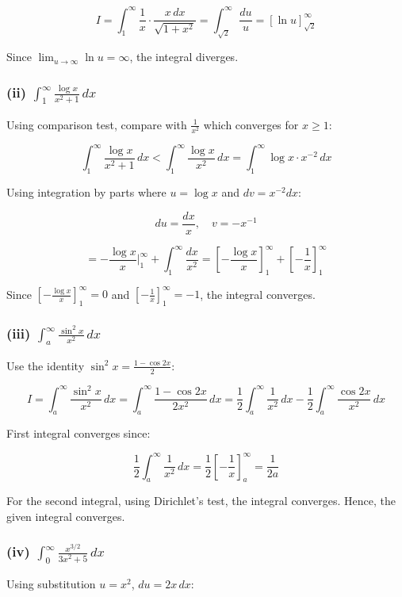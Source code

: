 \documentclass{article}
\begin{document}
\[
I = \int_1^\infty \frac{1}{x} \cdot \frac{x \, dx}{\sqrt{1 + x^2}} = \int_{\sqrt{2}}^\infty \frac{du}{u} = \left[ \ln u \right]_{\sqrt{2}}^\infty
\]


Since \(\lim_{u \to \infty} \ln u = \infty\), the integral diverges.

\subsubsection*{(ii) \(\int_1^\infty \frac{\log x}{x^2 + 1} \, dx\)}
Using comparison test, compare with \(\frac{1}{x^2}\) which converges for \( x \geq 1 \):


\[
\int_1^\infty \frac{\log x}{x^2 + 1} \, dx < \int_1^\infty \frac{\log x}{x^2} \, dx = \int_1^\infty \log x \cdot x^{-2} \, dx
\]


Using integration by parts where \( u = \log x \) and \( dv = x^{-2} dx \):


\[
du = \frac{dx}{x}, \quad v = -x^{-1}
\]




\[
= -\frac{\log x}{x} \Bigg|_1^\infty + \int_1^\infty \frac{dx}{x^2} = \left[ -\frac{\log x}{x} \right]_1^\infty + \left[ -\frac{1}{x} \right]_1^\infty
\]


Since \(\left[ -\frac{\log x}{x} \right]_1^\infty = 0\) and \(\left[ -\frac{1}{x} \right]_1^\infty = -1\), the integral converges.

\subsubsection*{(iii) \(\int_a^\infty \frac{\sin^2 x}{x^2} \, dx\)}
Use the identity \(\sin^2 x = \frac{1 - \cos 2x}{2}\):


\[
I = \int_a^\infty \frac{\sin^2 x}{x^2} \, dx = \int_a^\infty \frac{1 - \cos 2x}{2x^2} \, dx = \frac{1}{2} \int_a^\infty \frac{1}{x^2} \, dx - \frac{1}{2} \int_a^\infty \frac{\cos 2x}{x^2} \, dx
\]


First integral converges since:


\[
\frac{1}{2} \int_a^\infty \frac{1}{x^2} \, dx = \frac{1}{2} \left[ -\frac{1}{x} \right]_a^\infty = \frac{1}{2a}
\]


For the second integral, using Dirichlet's test, the integral converges. Hence, the given integral converges.

\subsubsection*{(iv) \(\int_0^\infty \frac{x^{3/2}}{3x^2 + 5} \, dx\)}
Using substitution \( u = x^2 \), \( du = 2x \, dx \):
\end{document}
